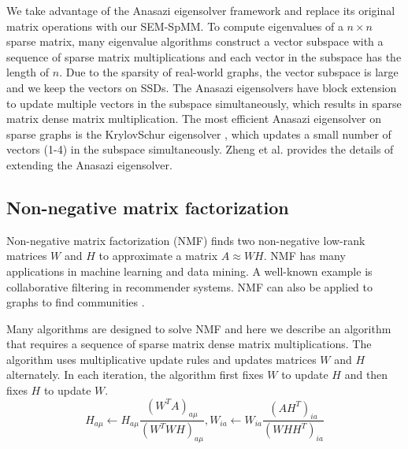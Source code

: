 We take advantage of the Anasazi eigensolver framework \cite{anasazi} and
replace its original matrix operations with our SEM-SpMM. To compute eigenvalues
of a $n \times n$ sparse matrix, many eigenvalue algorithms construct a vector
subspace with a sequence of sparse matrix multiplications and each vector in
the subspace has the length of $n$. Due to the sparsity of real-world graphs,
the vector subspace is large and we keep the vectors on SSDs.
The Anasazi eigensolvers have block extension to update multiple vectors in
the subspace simultaneously, which results in sparse matrix dense
matrix multiplication. The most efficient Anasazi eigensolver on sparse graphs
is the KrylovSchur eigensolver \cite{krylovschur}, which updates a small number
of vectors (1-4) in the subspace simultaneously. Zheng et al.
\cite{flasheigen} provides the details of extending the Anasazi eigensolver.


\subsection{Non-negative matrix factorization}
Non-negative matrix factorization (NMF) \cite{nmf} finds two non-negative
low-rank matrices $W$ and $H$ to approximate a matrix $A \approx WH$. NMF
has many applications in machine learning
and data mining. A well-known example is collaborative filtering \cite{cf} in
recommender systems. NMF can also be applied to graphs to find communities
\cite{yang13, wang11}.

Many algorithms are designed to solve NMF and here we describe an algorithm
\cite{nmf} that requires a sequence of sparse matrix dense matrix multiplications.
The algorithm uses multiplicative update rules and updates matrices $W$ and $H$
alternately. In each iteration, the algorithm first fixes $W$ to update $H$
and then fixes $H$ to update $W$.
\begin{equation*}
H_{a\mu} \leftarrow H_{a\mu} \frac{{(W^TA)}_{a\mu}}{{(W^TWH)}_{a\mu}},
W_{ia} \leftarrow W_{ia} \frac{{(AH^T)}_{ia}}{{(WHH^T)}_{ia}}
\end{equation*}

